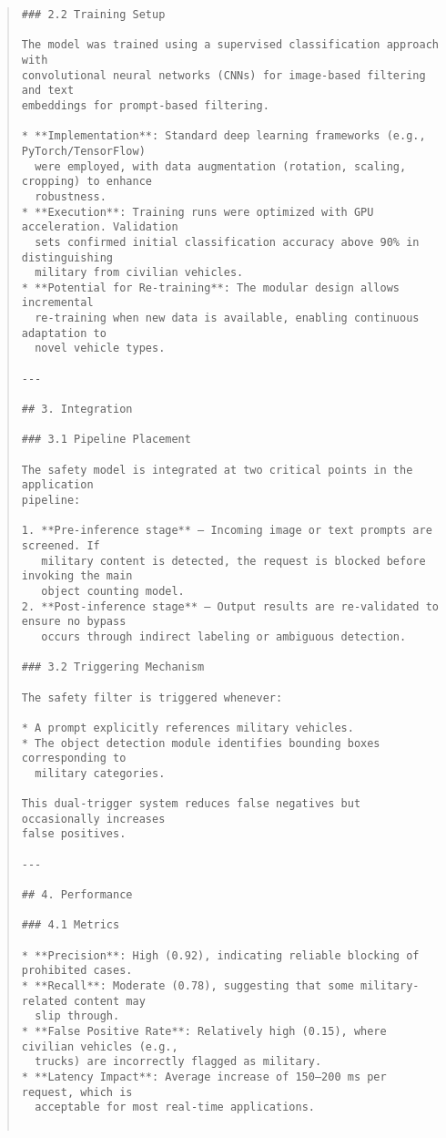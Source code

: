 \documentclass[11pt]{article}
\begin{document}
\begin{quote}
\begin{verbatim}
### 2.2 Training Setup

The model was trained using a supervised classification approach with
convolutional neural networks (CNNs) for image-based filtering and text
embeddings for prompt-based filtering.

* **Implementation**: Standard deep learning frameworks (e.g., PyTorch/TensorFlow)
  were employed, with data augmentation (rotation, scaling, cropping) to enhance
  robustness.
* **Execution**: Training runs were optimized with GPU acceleration. Validation
  sets confirmed initial classification accuracy above 90% in distinguishing
  military from civilian vehicles.
* **Potential for Re-training**: The modular design allows incremental
  re-training when new data is available, enabling continuous adaptation to
  novel vehicle types.

---

## 3. Integration

### 3.1 Pipeline Placement

The safety model is integrated at two critical points in the application
pipeline:

1. **Pre-inference stage** – Incoming image or text prompts are screened. If
   military content is detected, the request is blocked before invoking the main
   object counting model.
2. **Post-inference stage** – Output results are re-validated to ensure no bypass
   occurs through indirect labeling or ambiguous detection.

### 3.2 Triggering Mechanism

The safety filter is triggered whenever:

* A prompt explicitly references military vehicles.
* The object detection module identifies bounding boxes corresponding to
  military categories.

This dual-trigger system reduces false negatives but occasionally increases
false positives.

---

## 4. Performance

### 4.1 Metrics

* **Precision**: High (0.92), indicating reliable blocking of prohibited cases.
* **Recall**: Moderate (0.78), suggesting that some military-related content may
  slip through.
* **False Positive Rate**: Relatively high (0.15), where civilian vehicles (e.g.,
  trucks) are incorrectly flagged as military.
* **Latency Impact**: Average increase of 150–200 ms per request, which is
  acceptable for most real-time applications.


\end{verbatim}
\end{quote}
\end{document}
